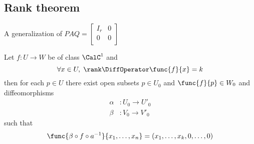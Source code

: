 \subsection{Rank theorem}
A generalization of \(PAQ = \begin{bmatrix}
    I_r & 0 \\
    0   & 0 \\
\end{bmatrix}\)
\begin{theorem}
    Let \(f: U \to W\) be of class \(\CalC^1\) and
    \begin{equation*}
        \forall x \in U, \; \rank \DiffOperator \func{f}{x} = k
    \end{equation*}
    then for each \(p \in U\) there exist open subsets \(p \in U_0\) and \(\func{f}{p} \in W_0\) and diffeomorphisms
    \begin{align*}
        \alpha & : U_0 \to U'_0 \\
        \beta  & : V_0 \to V'_0
    \end{align*}
    such that
    \begin{equation*}
        \func{ \beta \circ f \circ a^{-1} }{x_1, \dots, x_n} = (x_1, \dots , x_k, 0 , \dots, 0)
    \end{equation*}
\end{theorem}

